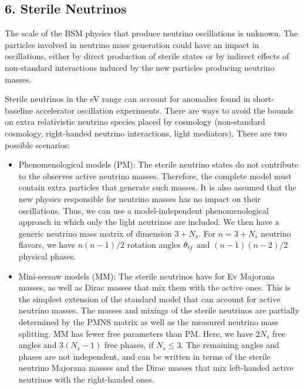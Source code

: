 \documentclass[twocolumn]{article}
\renewcommand{\th}[1][]{%
  \theta\ifx\\#1\\\else_\text{#1}\fi
}
\begin{document}
\subsection*{6. Sterile Neutrinos}
The scale of the BSM physics that produce neutrino oscillations is unknown. The particles involved in neutrino mass generation could have an impact in oscillations, either by direct production of sterile states or by indirect effects of non-standard interactions induced by the new particles producing neutrino masses. 

Sterile neutrinos in the eV range can account for anomalies found in short-baseline accelerator oscillation experiments. There are ways to avoid the bounds on extra relativistic neutrino species placed by cosmology (non-standard cosmology, right-handed neutrino interactions, light mediators). 
There are two possible scenarios:
\begin{itemize}
  \item Phenomenological models (PM): The sterile neutrino states do not contribute to the observes active neutrino masses. Therefore, the complete model must contain extra particles that generate such masses. It is also assumed that the new physics responsible for neutrino masses has no impact on their oscillations. Thus, we can use a model-independent phenomenological approach in which only the light neutrinos are included. We then have  a generic neutrino mass matrix of dimension $3+N_s$. For $n = 3+N_s$ neutrino flavors, we have $n(n-1)/2$ rotation angles $\th_{ij}$ and $(n-1)(n-2)/2$ physical phases.
  \item Mini-seesaw models (MM): The sterile neutrinos have for Ev Majorana masses, as well as Dirac masses that mix them with the active ones. This is the simplest extension of the standard model that can account for active neutrino masses. The masses and mixings of the sterile neutrinos are partially determined by the PMNS matrix as well as the measured neutrino mass splitting. MM has fewer free parameters than PM. Here, we have $2N_s$ free angles and $3(N_s-1)$ free phases, if $N_s \le 3$. The remaining angles and phases are not independent, and can be written in terms of the sterile neutrino Majorana masses and the Dirac masses that mix left-handed active neutrinos with the right-handed ones.
\end{itemize}
\end{document}
